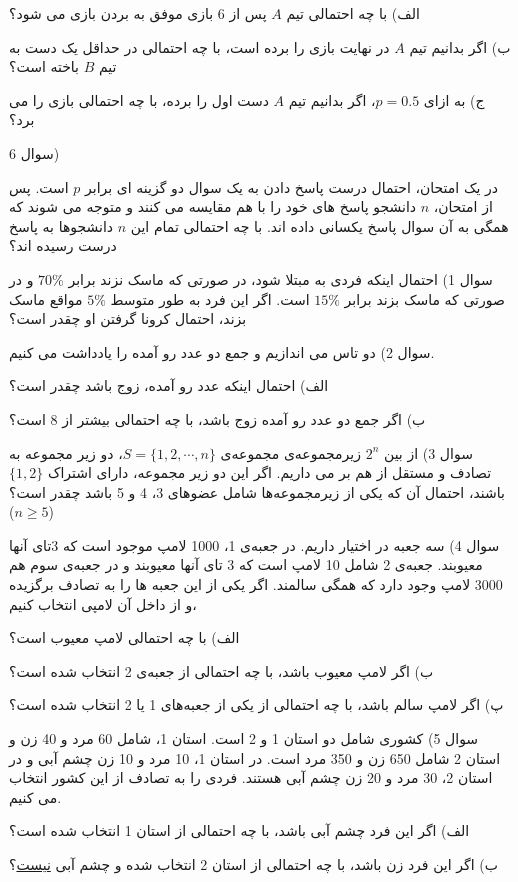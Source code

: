 \documentclass[10pt,letterpaper]{article}
\begin{document}
الف) با چه احتمالی تیم $A$ پس از 6 بازی موفق به بردن بازی می شود؟

ب) اگر بدانیم تیم $A$ در نهایت بازی را برده است، با چه احتمالی در حداقل یک دست به تیم $B$ باخته است؟

ج) به ازای $p=0.5$، اگر بدانیم تیم $A$ دست اول را برده، با چه احتمالی بازی را می برد؟

سوال 6)

در یک امتحان، احتمال درست پاسخ دادن به یک سوال دو گزینه ای برابر $p$ است. پس از امتحان، $n$ دانشجو پاسخ های خود را با هم مقایسه می کنند و متوجه می شوند که همگی به آن سوال پاسخ یکسانی داده اند. با چه احتمالی تمام این $n$ دانشجوها به پاسخ درست رسیده اند؟

سوال 1) احتمال اینکه فردی به
 مبتلا شود، در صورتی که ماسک نزند برابر $70\%$ و در صورتی که ماسک بزند برابر $15\%$ است. اگر این فرد به طور متوسط $5\%$ مواقع ماسک بزند، احتمال کرونا گرفتن او چقدر است؟

سوال 2) دو تاس می اندازیم و جمع دو عدد رو آمده را یادداشت می کنیم.

الف) احتمال اینکه عدد رو آمده، زوج باشد چقدر است؟

ب) اگر جمع دو عدد رو آمده زوج باشد، با چه احتمالی بیشتر از 8 است؟

سوال 3) از بین $2^n$ زیرمجموعه‌ی مجموعه‌ی $S=\{1,2,\cdots,n\}$، دو زیر مجموعه به تصادف و مستقل از هم بر می داریم. اگر این دو زیر مجموعه، دارای اشتراک $\{1,2\}$ باشند، احتمال آن که یکی از زیرمجموعه‌ها شامل عضوهای 3، 4 و 5 باشد چقدر است؟ ($n\ge 5$)

سوال 4) سه جعبه در اختیار داریم. در جعبه‌ی 1، 1000 لامپ موجود است که 3تای آنها معیوبند. جعبه‌ی 2 شامل 10 لامپ است که 3 تای آنها معیوبند و در جعبه‌ی سوم هم 3000 لامپ وجود دارد که همگی سالمند. اگر یکی از این جعبه ها را به تصادف برگزیده و از داخل آن لامپی انتخاب کنیم،

الف) با چه احتمالی لامپ معیوب است؟

ب) اگر لامپ معیوب باشد، با چه احتمالی از جعبه‌ی 2 انتخاب شده است؟

پ) اگر لامپ سالم باشد، با چه احتمالی از یکی از جعبه‌های 1 یا 2 انتخاب شده است؟

سوال 5) کشوری شامل دو استان 1 و 2 است. استان 1، شامل 60 مرد و 40 زن و استان 2 شامل 650 زن و 350 مرد است. در استان 1، 10 مرد و 10 زن چشم آبی و در استان 2، 30 مرد و 20 زن چشم آبی هستند. فردی را به تصادف از این کشور انتخاب می کنیم.

الف) اگر این فرد چشم آبی باشد، با چه احتمالی از استان 1 انتخاب شده است؟

ب) اگر این فرد زن باشد، با چه احتمالی از استان 2 انتخاب شده و چشم آبی \underline{نیست}؟
\end{document}
